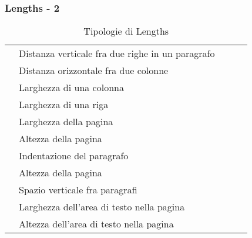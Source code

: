 \begin{frame}[fragile]
\frametitle{Lengths - 2}

\begin{table}[]
\caption{Tipologie di Lengths}
\begin{tabular}{l|llll}
\cline{1-2}
\texttt{\baselineskip} & Distanza verticale fra due righe in un paragrafo  \\ \cline{1-2}
\texttt{\columnsep} & Distanza orizzontale fra due colonne  \\ \cline{1-2}
\texttt{\columnwidth} & Larghezza di una colonna  \\ \cline{1-2}
\texttt{\linewidth} & Larghezza di una riga  \\ \cline{1-2}
\texttt{\paperwidth} & Larghezza della pagina  \\ \cline{1-2}
\texttt{\paperheight} & Altezza della pagina   \\ \cline{1-2}
\texttt{\parindent} & Indentazione del paragrafo  \\ \cline{1-2}
\texttt{\paperheight} & Altezza della pagina   \\ \cline{1-2}
\texttt{\parskip} & Spazio verticale fra paragrafi   \\ \cline{1-2}
\texttt{\textwidth} & Larghezza dell'area di testo nella pagina  \\ \cline{1-2}
\texttt{\textheight} & Altezza dell'area di testo nella pagina   \\ \cline{1-2}
\end{tabular}
\end{table}

\end{frame}